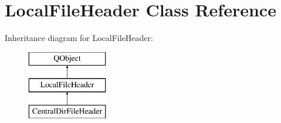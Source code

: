 \hypertarget{class_local_file_header}{}\section{Local\+File\+Header Class Reference}
\label{class_local_file_header}
Inheritance diagram for Local\+File\+Header\+:\begin{figure}[H]
\begin{center}
\leavevmode
\includegraphics[height=3.000000cm]{class_local_file_header}
\end{center}
\end{figure}
